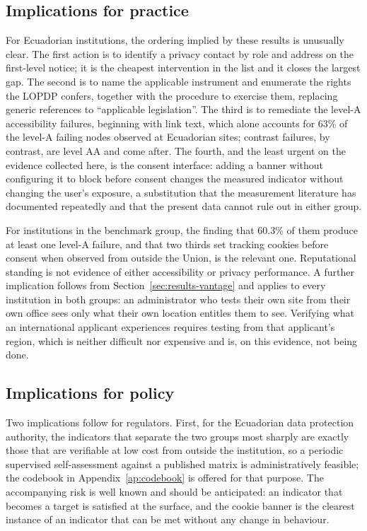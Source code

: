 \documentclass[pdflatex,sn-basic,Numbered,iicol]{sn-jnl}
\theoremstyle{thmstyleone}
\theoremstyle{thmstyletwo}
\theoremstyle{thmstylethree}
\begin{document}
\subsection{Implications for practice}\label{sec:discussion-practice}

For Ecuadorian institutions, the ordering implied by these results is unusually clear. The first action is to identify a privacy contact by role and address on the first-level notice; it is the cheapest intervention in the list and it closes the largest gap. The second is to name the applicable instrument and enumerate the rights the LOPDP confers, together with the procedure to exercise them, replacing generic references to ``applicable legislation''. The third is to remediate the level-A accessibility failures, beginning with link text, which alone accounts for 63\% of the level-A failing nodes observed at Ecuadorian sites; contrast failures, by contrast, are level AA and come after. The fourth, and the least urgent on the evidence collected here, is the consent interface: adding a banner without configuring it to block before consent changes the measured indicator without changing the user's exposure, a substitution that the measurement literature has documented repeatedly \citep{sanchezrola2019can,bollinger2022automating} and that the present data cannot rule out in either group.

For institutions in the benchmark group, the finding that 60.3\% of them produce at least one level-A failure, and that two thirds set tracking cookies before consent when observed from outside the Union, is the relevant one. Reputational standing is not evidence of either accessibility or privacy performance. A further implication follows from Section~\ref{sec:results-vantage} and applies to every institution in both groups: an administrator who tests their own site from their own office sees only what their own location entitles them to see. Verifying what an international applicant experiences requires testing from that applicant's region, which is neither difficult nor expensive and is, on this evidence, not being done.

\subsection{Implications for policy}\label{sec:discussion-policy}

Two implications follow for regulators. First, for the Ecuadorian data protection authority, the indicators that separate the two groups most sharply are exactly those that are verifiable at low cost from outside the institution, so a periodic supervised self-assessment against a published matrix is administratively feasible; the codebook in Appendix~\ref{ap:codebook} is offered for that purpose. The accompanying risk is well known and should be anticipated: an indicator that becomes a target is satisfied at the surface, and the cookie banner is the clearest instance of an indicator that can be met without any change in behaviour.
\end{document}
